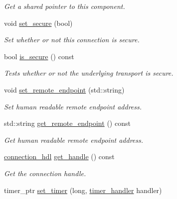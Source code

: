 \begin{DoxyCompactItemize}
\begin{DoxyCompactList}\small\item\em Get a shared pointer to this component. \end{DoxyCompactList}\item 
void \hyperlink{classwebsocketpp_1_1transport_1_1debug_1_1connection_a70244283cf80113e73f6dda8c1a2c4be}{set\+\_\+secure} (bool)
\begin{DoxyCompactList}\small\item\em Set whether or not this connection is secure. \end{DoxyCompactList}\item 
bool \hyperlink{classwebsocketpp_1_1transport_1_1debug_1_1connection_a49c3bba737ddb4a2ef6bf0c3b40fd130}{is\+\_\+secure} () const
\begin{DoxyCompactList}\small\item\em Tests whether or not the underlying transport is secure. \end{DoxyCompactList}\item 
void \hyperlink{classwebsocketpp_1_1transport_1_1debug_1_1connection_a3c0a3a5bc888a570c287190d299cf276}{set\+\_\+remote\+\_\+endpoint} (std\+::string)
\begin{DoxyCompactList}\small\item\em Set human readable remote endpoint address. \end{DoxyCompactList}\item 
std\+::string \hyperlink{classwebsocketpp_1_1transport_1_1debug_1_1connection_a8e32def2e7de74a13684571cccce494b}{get\+\_\+remote\+\_\+endpoint} () const
\begin{DoxyCompactList}\small\item\em Get human readable remote endpoint address. \end{DoxyCompactList}\item 
\hyperlink{namespacewebsocketpp_a6b3d26a10ee7229b84b776786332631d}{connection\+\_\+hdl} \hyperlink{classwebsocketpp_1_1transport_1_1debug_1_1connection_a258046ad6f04c2fe9d3b31da345c282f}{get\+\_\+handle} () const
\begin{DoxyCompactList}\small\item\em Get the connection handle. \end{DoxyCompactList}\item 
timer\+\_\+ptr \hyperlink{classwebsocketpp_1_1transport_1_1debug_1_1connection_a56b96fed344bafbbb0453997dbf54f40}{set\+\_\+timer} (long, \hyperlink{namespacewebsocketpp_1_1transport_a946cc56ff41139f3002149c15fd87bc9}{timer\+\_\+handler} handler)

\end{DoxyCompactItemize}
